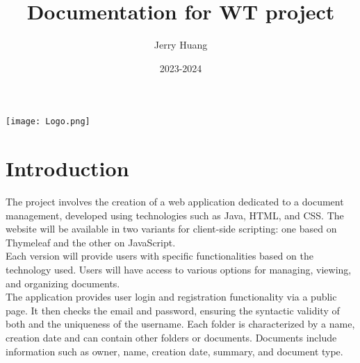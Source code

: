 \documentclass[a4paper,12pt]{article}
\title{Documentation for WT project}
\author{Jerry Huang}
\date{2023-2024}
\begin{document}
\maketitle
\begin{center}
\texttt{[image: Logo.png]}
\end{center}
\newpage
\tableofcontents
\listoffigures

\newpage


\section{Introduction}

The project involves the creation of a web application dedicated to a document management, developed using technologies such as Java, HTML, and CSS. The website will be available in two variants for client-side scripting: one based on Thymeleaf and the other on JavaScript.\\ Each version will provide users with specific functionalities based on the technology used. Users will have access to various options for managing, viewing, and organizing documents.\\ The application provides user login and registration functionality via a public page. It then checks the email and password, ensuring the syntactic validity of both and the uniqueness of the username. Each folder is characterized by a name, creation date and can contain other folders or documents. Documents include information such as owner, name, creation date, summary, and document type. 
\end{document}
